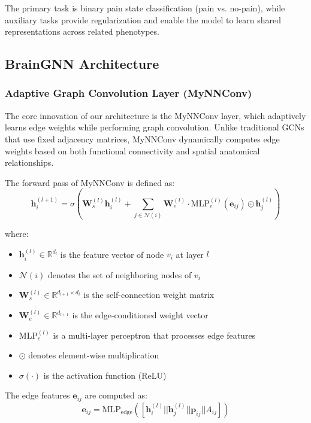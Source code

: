 \documentclass[10pt,journal,compsoc]{IEEEtran}
\begin{document}
The primary task is binary pain state classification (pain vs. no-pain), while auxiliary tasks provide regularization and enable the model to learn shared representations across related phenotypes.

\subsection{BrainGNN Architecture}

\subsubsection{Adaptive Graph Convolution Layer (MyNNConv)}

The core innovation of our architecture is the MyNNConv layer, which adaptively learns edge weights while performing graph convolution. Unlike traditional GCNs that use fixed adjacency matrices, MyNNConv dynamically computes edge weights based on both functional connectivity and spatial anatomical relationships.

The forward pass of MyNNConv is defined as:
\begin{equation}
\mathbf{h}_i^{(l+1)} = \sigma\left(\mathbf{W}_s^{(l)} \mathbf{h}_i^{(l)} + \sum_{j \in \mathcal{N}(i)} \mathbf{W}_e^{(l)} \cdot \text{MLP}_e^{(l)}(\mathbf{e}_{ij}) \odot \mathbf{h}_j^{(l)}\right)
\end{equation}

where:
\begin{itemize}
\item $\mathbf{h}_i^{(l)} \in \mathbb{R}^{d_l}$ is the feature vector of node $v_i$ at layer $l$
\item $\mathcal{N}(i)$ denotes the set of neighboring nodes of $v_i$
\item $\mathbf{W}_s^{(l)} \in \mathbb{R}^{d_{l+1} \times d_l}$ is the self-connection weight matrix
\item $\mathbf{W}_e^{(l)} \in \mathbb{R}^{d_{l+1}}$ is the edge-conditioned weight vector
\item $\text{MLP}_e^{(l)}$ is a multi-layer perceptron that processes edge features
\item $\odot$ denotes element-wise multiplication
\item $\sigma(\cdot)$ is the activation function (ReLU)
\end{itemize}

The edge features $\mathbf{e}_{ij}$ are computed as:
\begin{equation}
\mathbf{e}_{ij} = \text{MLP}_{\text{edge}}\left([\mathbf{h}_i^{(l)} || \mathbf{h}_j^{(l)} || \mathbf{p}_{ij} || A_{ij}]\right)
\end{equation}
\end{document}
